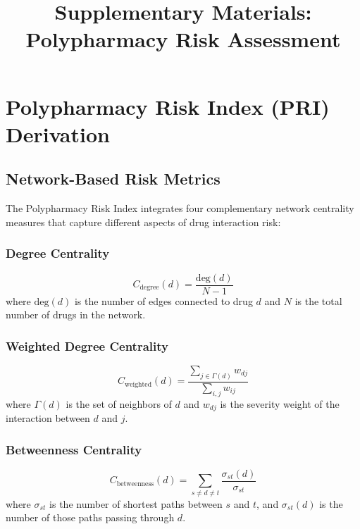 \documentclass[11pt,a4paper]{article}
\begin{document}
\title{Supplementary Materials: Polypharmacy Risk Assessment}
\date{}
\maketitle

\tableofcontents
\newpage

\section{Polypharmacy Risk Index (PRI) Derivation}

\subsection{Network-Based Risk Metrics}

The Polypharmacy Risk Index integrates four complementary network centrality measures that capture different aspects of drug interaction risk:

\subsubsection{Degree Centrality}
\begin{equation}
C_{\text{degree}}(d) = \frac{\text{deg}(d)}{N - 1}
\end{equation}
where $\text{deg}(d)$ is the number of edges connected to drug $d$ and $N$ is the total number of drugs in the network.

\subsubsection{Weighted Degree Centrality}
\begin{equation}
C_{\text{weighted}}(d) = \frac{\sum_{j \in \Gamma(d)} w_{dj}}{\sum_{i,j} w_{ij}}
\end{equation}
where $\Gamma(d)$ is the set of neighbors of $d$ and $w_{dj}$ is the severity weight of the interaction between $d$ and $j$.

\subsubsection{Betweenness Centrality}
\begin{equation}
C_{\text{betweenness}}(d) = \sum_{s \neq d \neq t} \frac{\sigma_{st}(d)}{\sigma_{st}}
\end{equation}
where $\sigma_{st}$ is the number of shortest paths between $s$ and $t$, and $\sigma_{st}(d)$ is the number of those paths passing through $d$.
\end{document}
